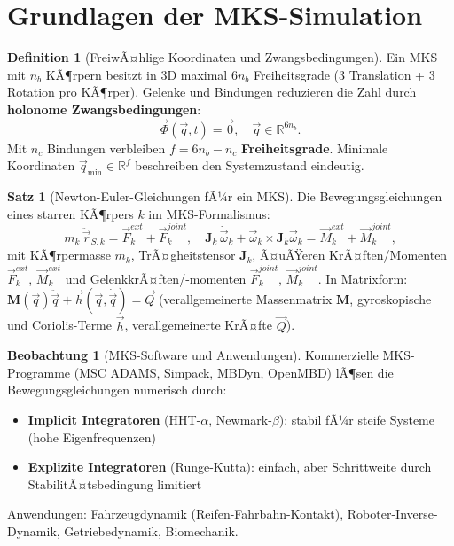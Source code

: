﻿\documentclass[a4paper,12pt]{report}
\theoremstyle{definition}
\newtheorem{definition}{Definition}
\newtheorem{satz}{Satz}
\newtheorem{beobachtung}{Beobachtung}
\begin{document}
\section{Grundlagen der MKS-Simulation}

\begin{definition}[FreiwÃ¤hlige Koordinaten und Zwangsbedingungen]
Ein MKS mit $n_b$ KÃ¶rpern besitzt in 3D maximal $6n_b$ Freiheitsgrade
(3 Translation + 3 Rotation pro KÃ¶rper). Gelenke und Bindungen
reduzieren die Zahl durch \textbf{holonome Zwangsbedingungen}:
\[
  \vec{\Phi}(\vec{q}, t) = \vec{0}, \quad \vec{q} \in \mathbb{R}^{6n_b}.
\]
Mit $n_c$ Bindungen verbleiben $f = 6n_b - n_c$ \textbf{Freiheitsgrade}.
Minimale Koordinaten $\vec{q}_{\min} \in \mathbb{R}^f$ beschreiben den
Systemzustand eindeutig.
\end{definition}

\begin{satz}[Newton-Euler-Gleichungen fÃ¼r ein MKS]
Die Bewegungsgleichungen eines starren KÃ¶rpers $k$ im MKS-Formalismus:
\[
  m_k\,\ddot{\vec{r}}_{S,k} = \vec{F}_k^{ext} + \vec{F}_k^{joint},
  \quad
  \mathbf{J}_k\,\dot{\vec{\omega}}_k + \vec{\omega}_k \times \mathbf{J}_k\vec{\omega}_k
  = \vec{M}_k^{ext} + \vec{M}_k^{joint},
\]
mit KÃ¶rpermasse $m_k$, TrÃ¤gheitstensor $\mathbf{J}_k$,
Ã¤uÃŸeren KrÃ¤ften/Momenten $\vec{F}_k^{ext}$, $\vec{M}_k^{ext}$
und GelenkkrÃ¤ften/-momenten $\vec{F}_k^{joint}$, $\vec{M}_k^{joint}$.
In Matrixform: $\mathbf{M}(\vec{q})\ddot{\vec{q}} + \vec{h}(\vec{q},\dot{\vec{q}}) = \vec{Q}$
(verallgemeinerte Massenmatrix $\mathbf{M}$, gyroskopische und Coriolis-Terme $\vec{h}$,
verallgemeinerte KrÃ¤fte $\vec{Q}$).
\end{satz}

\begin{beobachtung}[MKS-Software und Anwendungen]
Kommerzielle MKS-Programme (MSC ADAMS, Simpack, MBDyn, OpenMBD)
lÃ¶sen die Bewegungsgleichungen numerisch durch:
\begin{itemize}
    \item[-] \textbf{Implicit Integratoren} (HHT-$\alpha$, Newmark-$\beta$):
          stabil fÃ¼r steife Systeme (hohe Eigenfrequenzen)
    \item[-] \textbf{Explizite Integratoren} (Runge-Kutta): einfach,
          aber Schrittweite durch StabilitÃ¤tsbedingung limitiert
\end{itemize}
Anwendungen: Fahrzeugdynamik (Reifen-Fahrbahn-Kontakt),
Roboter-Inverse-Dynamik, Getriebedynamik, Biomechanik.
\end{beobachtung}
\end{document}
